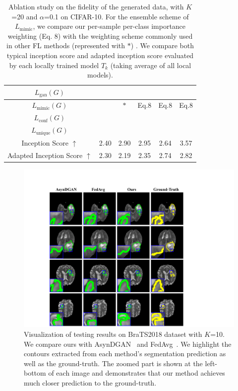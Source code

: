 \documentclass[letterpaper]{article} %
\newcommand{\cmark}{\ding{51}}%
\newcommand{\xmark}{\ding{55}}%
\begin{document}
\begin{table}[t]
\begin{center}
\resizebox{\columnwidth}{!}
{
\begin{tabular}{c|ccccc}
\hline
$L_\text{gan}(G)$  &\cmark &\cmark &\cmark &\cmark &\cmark \\\hline
{$L_\text{mimic}(G)$} &\xmark  &$*$ &Eq.8  &Eq.8  &Eq.8 \\\hline
{$L_\text{conf}(G)$} &\xmark &\xmark &\xmark  &\cmark &\cmark\\\hline
{$L_\text{unique}(G)$} &\xmark &\xmark &\xmark  &\xmark &\cmark\\\hline
{Inception Score $\uparrow$} &2.40 &2.90 &2.95 &2.64 &3.57 \\
{Adapted Inception Score $\uparrow$} &2.30 &2.19 &2.35 &2.74 &2.82 \\
\hline
\end{tabular}}

\end{center}
\caption{Ablation study on the fidelity of the generated data, with $K$=20 and $\alpha$=0.1 on CIFAR-10. For the ensemble scheme of $L_\text{mimic}$, we compare our per-sample per-class importance weighting (Eq. 8) with the weighting scheme commonly used in other FL methods (represented with $*$) \cite{lin2020ensemble, hsu2020federated}. We compare both typical inception score and adapted inception score  evaluated by each locally trained model $T_k$ (taking average of all local models).}
\label{tab:cifars1}
\end{table}


\begin{figure}[h]
\centering
\includegraphics[width=\linewidth]{fig/sfig1.pdf}
\caption{Visualization of testing results on BraTS2018 dataset with $K$=10. We compare ours with AsynDGAN~\cite{chang2020synthetic} and FedAvg~\cite{mcmahan2017communication}.  We highlight the contours extracted from each method's segmentation prediction as well as the ground-truth. The zoomed part is shown at the left-bottom of each image and demonstrates that our method achieves much closer prediction to the ground-truth.
} 
\label{fig:s1}
\end{figure}
\end{document}
